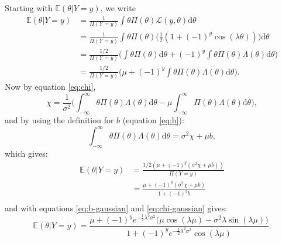 \documentclass[]{report}
\begin{document}
Starting with $\mathbb{E}(\theta | Y=y)$, we write
\begin{align}
    \mathbb{E}(\theta | Y=y) &= \frac{1}{\Pi(Y=y)} \int \theta \Pi(\theta)\mathcal{L}(y, \theta)\text{d}\theta\\
    &= \frac{1}{\Pi(Y=y)} \int \theta \Pi(\theta)\Big(\frac{1}{2}(1 + (-1)^{y} \cos(\lambda \theta))\Big)\text{d}\theta\\
    &= \frac{1/2}{\Pi(Y=y)} \Bigg(\int\theta\Pi(\theta)\text{d}\theta + (-1)^y \int\theta\Pi(\theta)\Lambda(\theta)\text{d}\theta\Bigg)\\
    &= \frac{1/2}{\Pi(Y=y)} \Bigg(\mu + (-1)^y \int\theta\Pi(\theta)\Lambda(\theta)\text{d}\theta\Bigg).
\end{align}
Now by equation \eqref{eq:chi},
\begin{equation}
    \chi = \frac{1}{\sigma^2}\Bigg( \int_{-\infty}^{\infty} \theta\Pi(\theta)\Lambda(\theta)\text{d}\theta - \mu \int_{-\infty}^{\infty} \Pi(\theta)\Lambda(\theta)\text{d}\theta\Bigg),
\end{equation}
and by using the definition for $b$ (equation \eqref{eq:b}):
\begin{equation}
    \int_{-\infty}^{\infty} \theta\Pi(\theta)\Lambda(\theta)\text{d}\theta = \sigma^2\chi + \mu b,
\end{equation}
which gives:
\begin{align}
    \mathbb{E}(\theta | Y=y) &= \frac{1/2(\mu + (-1)^y(\sigma^2\chi + \mu b))}{\Pi(Y=y)}\\
    &= \frac{\mu + (-1)^y(\sigma^2\chi + \mu b)}{1+(-1)^yb}\\
\end{align}
and with equations \eqref{eq:b-gaussian} and \eqref{eq:chi-gaussian} gives:
\begin{equation}
    \mathbb{E}(\theta | Y=y) = \frac{\mu + (-1)^ye^{-\frac{1}{2}\lambda^2\sigma^2}\big(\mu\cos(\lambda\mu) - \sigma^2\lambda \sin(\lambda\mu)\big)}{1+(-1)^ye^{-\frac{1}{2}\lambda^2\sigma^2}\cos(\lambda\mu)}.
\end{equation}
\end{document}
